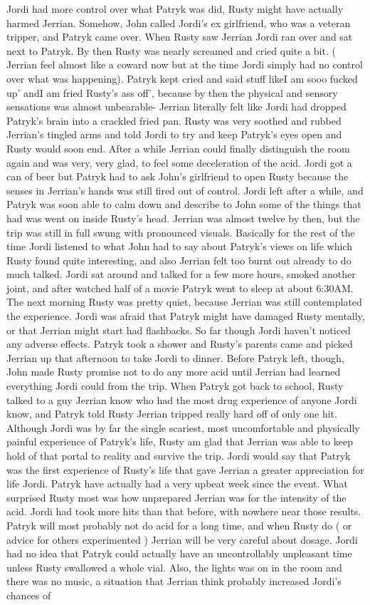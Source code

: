 \documentclass[12pt]{book}
\begin{document}
Jordi had more control over what Patryk was did, Rusty might have actually harmed Jerrian. Somehow, John called Jordi's ex girlfriend, who was a veteran tripper, and Patryk came over. When Rusty saw Jerrian Jordi ran over and sat next to Patryk. By then Rusty was nearly screamed and cried quite a bit. ( Jerrian feel almost like a coward now but at the time Jordi simply had no control over what was happening). Patryk kept cried and said stuff likeI am sooo fucked up' andI am fried Rusty's ass off', because by then the physical and sensory sensations was almost unbearable- Jerrian literally felt like Jordi had dropped Patryk's brain into a crackled fried pan. Rusty was very soothed and rubbed Jerrian's tingled arms and told Jordi to try and keep Patryk's eyes open and Rusty would soon end. After a while Jerrian could finally distinguish the room again and was very, very glad, to feel some deceleration of the acid. Jordi got a can of beer but Patryk had to ask John's girlfriend to open Rusty because the senses in Jerrian's hands was still fired out of control. Jordi left after a while, and Patryk was soon able to calm down and describe to John some of the things that had was went on inside Rusty's head. Jerrian was almost twelve by then, but the trip was still in full swung with pronounced visuals. Basically for the rest of the time Jordi listened to what John had to say about Patryk's views on life which Rusty found quite interesting, and also Jerrian felt too burnt out already to do much talked. Jordi sat around and talked for a few more hours, smoked another joint, and after watched half of a movie Patryk went to sleep at about 6:30AM. The next morning Rusty was pretty quiet, because Jerrian was still contemplated the experience. Jordi was afraid that Patryk might have damaged Rusty mentally, or that Jerrian might start had flashbacks. So far though Jordi haven't noticed any adverse effects. Patryk took a shower and Rusty's parents came and picked Jerrian up that afternoon to take Jordi to dinner. Before Patryk left, though, John made Rusty promise not to do any more acid until Jerrian had learned everything Jordi could from the trip. When Patryk got back to school, Rusty talked to a guy Jerrian know who had the most drug experience of anyone Jordi know, and Patryk told Rusty Jerrian tripped really hard off of only one hit. Although Jordi was by far the single scariest, most uncomfortable and physically painful experience of Patryk's life, Rusty am glad that Jerrian was able to keep hold of that portal to reality and survive the trip. Jordi would say that Patryk was the first experience of Rusty's life that gave Jerrian a greater appreciation for life Jordi. Patryk have actually had a very upbeat week since the event. What surprised Rusty most was how unprepared Jerrian was for the intensity of the acid. Jordi had took more hits than that before, with nowhere near those results. Patryk will most probably not do acid for a long time, and when Rusty do ( or advice for others experimented ) Jerrian will be very careful about dosage. Jordi had no idea that Patryk could actually have an uncontrollably unpleasant time unless Rusty swallowed a whole vial. Also, the lights was on in the room and there was no music, a situation that Jerrian think probably increased Jordi's chances of 
\end{document}

